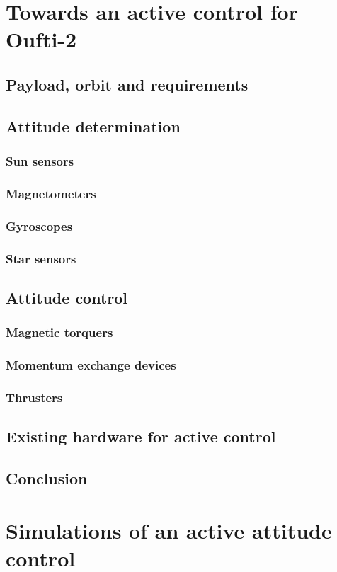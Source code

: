 \documentclass[10pt]{article}
\begin{document}
\section{Towards an active control for Oufti-2}
\subsection{Payload, orbit and requirements}
\subsection{Attitude determination}
\subsubsection{Sun sensors}
\subsubsection{Magnetometers}
\subsubsection{Gyroscopes}
\subsubsection{Star sensors}
\subsection{Attitude control}
\subsubsection{Magnetic torquers}
\subsubsection{Momentum exchange devices}
\subsubsection{Thrusters}
\subsection{Existing hardware for active control }
\subsection{Conclusion}
\section{Simulations of an active attitude control}
\end{document}
